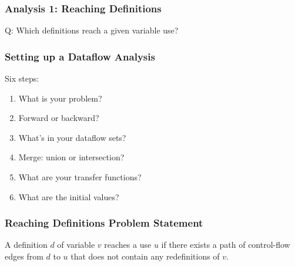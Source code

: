 \documentclass{beamer}
\begin{document}
\begin{frame}
  \frametitle{Analysis 1: Reaching Definitions}
\begin{center}
Q: Which definitions reach a given variable use?

\end{center}
\end{frame}

\begin{frame}
  \frametitle{Setting up a Dataflow Analysis}

Six steps:

\begin{enumerate}
\item What is your problem?
\item Forward or backward?
\item What's in your dataflow sets?
\item Merge: union or intersection?
\item What are your transfer functions?
\item What are the initial values?
\end{enumerate}
\end{frame}

\begin{frame}
  \frametitle{Reaching Definitions Problem Statement}

A definition $d$ of variable $v$ \alert{reaches} a use $u$ if
there exists a path of control-flow edges from $d$ to $u$ that
does not contain any redefinitions of $v$.

\end{frame}
\end{document}
